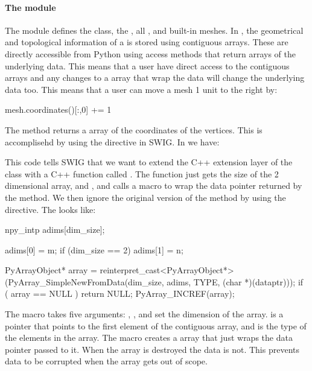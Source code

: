 \paragraph{The  module}
The  module defines the  class, the , all , and built-in meshes. In \dolfin,  the geometrical and topological information of a  is stored using contiguous arrays. These are directly accessible from Python using access methods that return \numpy arrays of the underlying data. This means that a user have direct access to the contiguous arrays and any changes to a \numpy array that wrap the data will change the underlying data too. This means that a user can move a mesh 1 unit to the right by:
\begin{python}
mesh.coordinates()[:,0] += 1
\end{python}
The  method returns a \numpy array of the coordinates of the vertices. This is accomplisehd by using the  directive in SWIG. In  we have:
This code tells SWIG that we want to extend the C++ extension layer of the  class with a C++ function called . The function just gets the size of the 2 dimensional array,  and , and calls a macro  to wrap the data pointer returned by the  method. We then ignore the original version of the  method by using the  directive. The  looks like:
\begin{c++}
  npy_intp adims[dim_size];

  adims[0] = m;
  if (dim_size == 2)
    adims[1] = n;

  PyArrayObject* array = reinterpret_cast<PyArrayObject*>(PyArray_SimpleNewFromData(dim_size, adims, TYPE, (char *)(dataptr)));
  if ( array == NULL ) return NULL;
  PyArray_INCREF(array);
\end{c++}
The macro takes five arguments: , , and  set the dimension of the \numpy array.  is a pointer that points to the first element of the contiguous array, and  is the type of the elements in the array. The \numpy macro  creates a \numpy array that just wraps the data pointer passed to it. When the \numpy array is destroyed the data is not. This prevents data to be corrupted when the \numpy array gets out of scope. 

